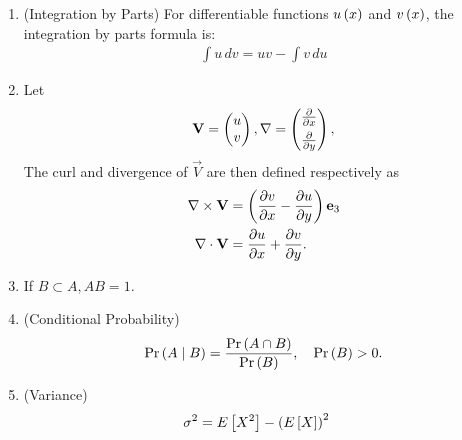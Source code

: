 \begin{enumerate}[label=\thesubsection.\arabic*, ref=\thesubsection.\theenumi,itemsep=0pt]
%
\item (Integration by Parts)
For differentiable functions $u\left(x\right)$ and $v\left(x\right)$, the integration by parts formula is:
\begin{align}
\int u \, dv = u v - \int v \, du 
\label{eq:integration_by_parts}
\end{align}
%
\item Let
\begin{align}
	\mathbf{V}&=\begin{pmatrix}u \\ v\end{pmatrix}, \nabla = \begin{pmatrix}\frac{\partial }{\partial x} \\[1ex] \frac{\partial }{\partial y}\end{pmatrix},
	\\
\end{align}
The curl and divergence of $\vec{V}$ are then defined respectively as
\begin{align}
	\label{eq:curl}
    \nabla\times\mathbf{V}
    &=\left(\frac{\partial v}{\partial x}
    -\frac{\partial u}{\partial y}\right)\mathbf{e}_3
    \\
    \nabla\cdot\mathbf{V}
    &=\frac{\partial u}{\partial x}
     +\frac{\partial v}{\partial y}.
	\label{eq:div}
\end{align}
%
%
\item	If $B \subset A, AB = 1$. 
	\label{eq:subset}
\item (Conditional Probability) 
\begin{align}
	\Pr\left(A \mid B\right) = \frac{\Pr\left(A \cap B\right)}{\Pr\left(B\right)}, \quad \Pr\left(B\right) > 0. 
	\label{eq:cond-prob}
\end{align}
	
\item (Variance) 
\begin{align}
	\sigma^2 &= E\left[ X^2 \right] - \left(E\left[ X \right]\right)^2 
	\label{eq:discrete_variance}
\end{align}

\end{enumerate}
